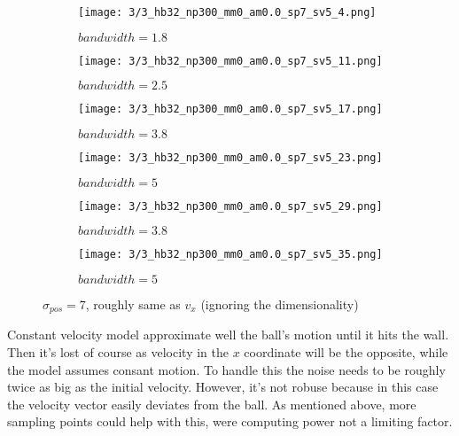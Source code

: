 \documentclass[10pt,a4paper,twoside]{article}
\newcommand{\sweepsize}{0.26}
\begin{document}
\begin{figure}[h]
    \centering
    \begin{subfigure}{\sweepsize\textwidth}
    \texttt{[image: 3/3\_hb32\_np300\_mm0\_am0.0\_sp7\_sv5\_4.png]} 
    \caption{$bandwidth=1.8$}
    \end{subfigure}
    \begin{subfigure}{\sweepsize\textwidth}
    \texttt{[image: 3/3\_hb32\_np300\_mm0\_am0.0\_sp7\_sv5\_11.png]} 
    \caption{$bandwidth=2.5$}
    \end{subfigure}
    \begin{subfigure}{\sweepsize\textwidth}
    \texttt{[image: 3/3\_hb32\_np300\_mm0\_am0.0\_sp7\_sv5\_17.png]} 
    \caption{$bandwidth=3.8$}
    \end{subfigure}
    \begin{subfigure}{\sweepsize\textwidth}
    \texttt{[image: 3/3\_hb32\_np300\_mm0\_am0.0\_sp7\_sv5\_23.png]} 
    \caption{$bandwidth=5$}
    \end{subfigure}
    \begin{subfigure}{\sweepsize\textwidth}
    \texttt{[image: 3/3\_hb32\_np300\_mm0\_am0.0\_sp7\_sv5\_29.png]} 
    \caption{$bandwidth=3.8$}
    \end{subfigure}
    \begin{subfigure}{\sweepsize\textwidth}
    \texttt{[image: 3/3\_hb32\_np300\_mm0\_am0.0\_sp7\_sv5\_35.png]} 
    \caption{$bandwidth=5$}
    \end{subfigure}
    \caption{$\sigma_{pos}=7$, roughly same as $v_x$ (ignoring the dimensionality)}

\end{figure}

Constant velocity model approximate well the ball's motion until it hits the
wall. Then it's lost of course as velocity in the $x$ coordinate will be the
opposite, while the model assumes consant motion.
To handle this the noise needs to be roughly twice as big as the initial
velocity. However, it's not robuse because in this case the velocity vector easily deviates from the
ball. As mentioned above, more sampling points could help with this, were computing power not a limiting factor.
\end{document}
